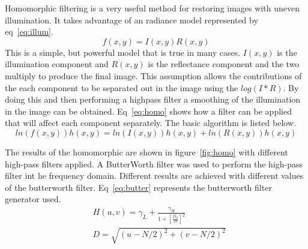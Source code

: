 \documentclass[letterpaper]{article}
\begin{document}
Homomorphic filtering is a very useful method for restoring images with uneven illumination. It takes advantage of an radiance model represented by eq~\ref{eq:illum}.
\begin{equation} \label{eq:illum}
f(x,y)=I(x,y)R(x,y)
\end{equation}
This is a simple, but powerful model that is true in many cases. $I(x,y)$ is the illumination component and $R(x,y)$ is the reflectance component and the two multiply to produce the final image. This assumption allows the contributions of the each component to be separated out in the image using the $log(I*R)$. By doing this and then performing a highpass filter a smoothing of the illumination in the image can be obtained. Eq~\ref{eq:homo} shows how a filter can be applied that will affect each component separately. The basic algorithm is listed below.
\begin{equation} \label{eq:homo}
ln(f(x,y))h(x,y)=ln(I(x,y))h(x,y) +ln(R(x,y))h(x,y)
\end{equation}


The results of the homomorphic are shown in figure~\ref{fig:homo} with different high-pass filters applied. A ButterWorth filter was used to perform the high-pass filter int he frequency domain. Different results are achieved with different values of the butterworth filter. Eq~\ref{eq:butter} represents the butterworth filter generator used.
\begin{align} \label{eq:butter}
&H(u,v)=\gamma_{L}+\frac{\gamma_{H}}{1 + [\frac{D_{0}}{D}]^2} \\
& D = \sqrt{(u-N/2)^2+(v-N/2)^2} \nonumber
\end{align}

  
\end{document}
